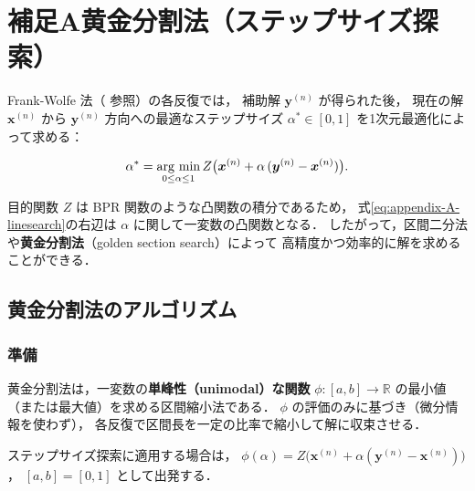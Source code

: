 
\section{補足A\quad 黄金分割法（ステップサイズ探索）}
\label{sec:appendix-A}

Frank-Wolfe 法（  参照）の各反復では，
補助解 $\boldsymbol{y}^{(n)}$ が得られた後，
現在の解 $\boldsymbol{x}^{(n)}$ から $\boldsymbol{y}^{(n)}$ 方向への最適なステップサイズ
$\alpha^* \in [0,1]$ を1次元最適化によって求める：

\begin{equation}
  \alpha^* = \mathop{\rm arg~min}_{0 \leq \alpha \leq 1}
    Z\bigl(\boldsymbol{x}^{(n)} + \alpha\,(\boldsymbol{y}^{(n)} - \boldsymbol{x}^{(n)})\bigr).
  \label{eq:appendix-A-linesearch}
\end{equation}

目的関数 $Z$ は BPR 関数のような凸関数の積分であるため，
式\eqref{eq:appendix-A-linesearch}の右辺は $\alpha$ に関して一変数の凸関数となる．
したがって，区間二分法や\textbf{黄金分割法}（golden section search）によって
高精度かつ効率的に解を求めることができる\cite{Sheffi1985}．

\subsection{黄金分割法のアルゴリズム}
\label{subsec:appendix-A-algorithm}

\subsubsection*{準備}

黄金分割法は，一変数の\textbf{単峰性（unimodal）な関数}
$\phi: [a, b] \to \mathbb{R}$ の最小値（または最大値）を求める区間縮小法である．
$\phi$ の評価のみに基づき（微分情報を使わず），
各反復で区間長を一定の比率で縮小して解に収束させる．

ステップサイズ探索に適用する場合は，
$\phi(\alpha) = Z\bigl(\boldsymbol{x}^{(n)} + \alpha(\boldsymbol{y}^{(n)} - \boldsymbol{x}^{(n)})\bigr)$，
$[a, b] = [0, 1]$ として出発する．

